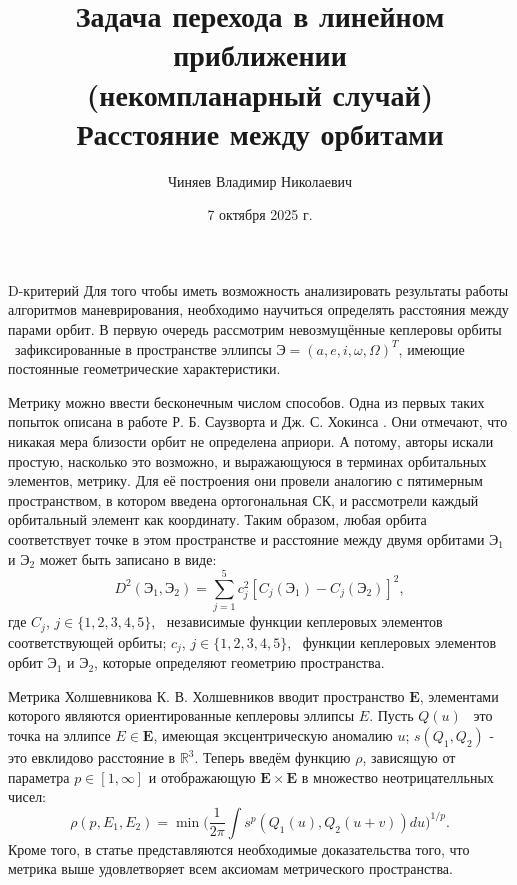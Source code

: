 \documentclass[9pt]{beamer}
\author[Автор]{Чиняев Владимир Николаевич}
\title{Задача перехода в линейном приближении \\ (некомпланарный случай) \\ Расстояние между орбитами}
\institute[]{Московский физико технический институт}
\date{7 октября 2025 г.}
\begin{document}
\begin{frame}
\titlepage
\end{frame}

\begin{frame}{D-критерий}
Для того чтобы иметь возможность анализировать результаты работы алгоритмов маневрирования, необходимо научиться определять расстояния между парами орбит. В первую очередь рассмотрим невозмущённые кеплеровы орбиты \textemdash\ зафиксированные в пространстве эллипсы $\textbf{Э} = \left( a, e, i, \omega, \Omega \right)^T$, имеющие постоянные геометрические характеристики.

Метрику можно ввести бесконечным числом способов. Одна из первых таких попыток описана в работе Р. Б. Саузворта и Дж. С. Хокинса \cite{Southworth_Hawkins}. Они отмечают, что никакая мера близости орбит не определена априори. А потому, авторы искали простую, насколько это возможно, и выражающуюся в терминах орбитальных элементов, метрику. Для её построения они провели аналогию с пятимерным пространством, в котором введена ортогональная СК, и рассмотрели каждый орбитальный элемент как координату. Таким образом, любая орбита соответствует точке в этом пространстве и расстояние между двумя орбитами $\textbf{Э}_1$ и $\textbf{Э}_2$ может быть записано в виде:
\begin{equation*}
    D^2(\textbf{Э}_1, \textbf{Э}_2) = \sum_{j=1}^{5} c_j^2 [C_j(\textbf{Э}_1) - C_j(\textbf{Э}_2)]^2,
\label{D-crit_first}
\end{equation*}
где $C_j$, $j \in \{1, 2, 3, 4, 5\}$, \textemdash\ независимые функции кеплеровых элементов соответствующей орбиты; $c_j$, $j \in \{1, 2, 3, 4, 5\}$, \textemdash\ функции кеплеровых элементов орбит $\textbf{Э}_1$ и $\textbf{Э}_2$, которые определяют геометрию пространства. 
\end{frame}

\begin{frame}{Метрика Холшевникова}
К. В. Холшевников вводит пространство $\mathbf{E}$, элементами которого являются ориентированные кеплеровы эллипсы $E$. Пусть $Q(u)$ \textemdash\ это точка на эллипсе $E \in \mathbf{E}$, имеющая эксцентрическую аномалию $u$; $s(Q_1, Q_2)$ - это евклидово расстояние в $\mathbb{R}^3$. Теперь введём функцию $\rho$, зависящую от параметра $p \in [1, \infty]$ и отображающую $\mathbf{E} \times \mathbf{E}$ в множество неотрицателльных чисел:
\begin{equation*}
    \rho (p, E_1, E_2) = \min \biggl( \frac{1}{2\pi} \int s^p (Q_1(u), Q_2(u + v)) du \biggl)^{1/p}.
\label{distance_first}
\end{equation*}
Кроме того, в статье \cite{Kholshevnikov} представляются необходимые доказательства того, что метрика выше удовлетворяет всем аксиомам метрического пространства. 
\end{frame}
\end{document}
